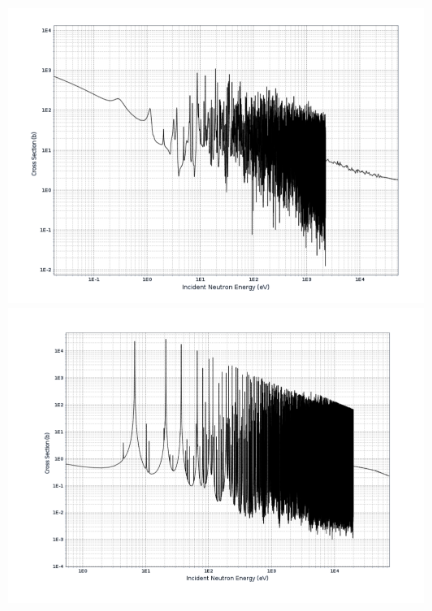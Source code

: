 \documentclass{report}
\begin{document}
\begin{center}
\includegraphics[width=11cm]{u235_fission.png}\\
\includegraphics[width=11cm]{u238_absorption.png}\\
\end{center}
\end{document}
